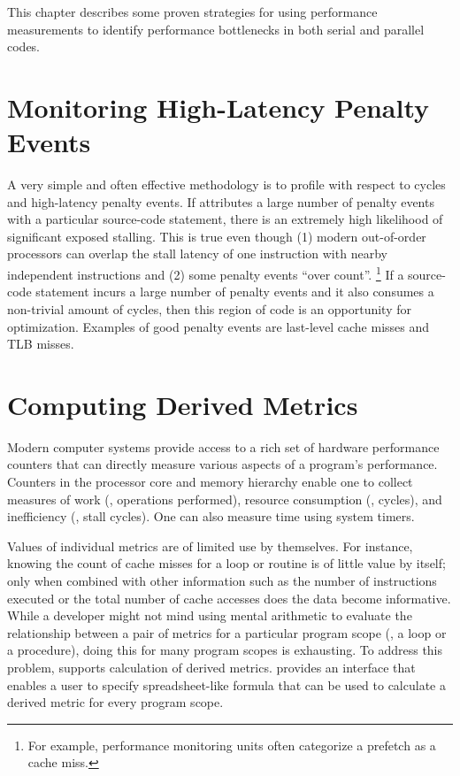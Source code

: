 \documentclass[11pt,letterpaper]{report}
\begin{document}
This chapter describes some proven strategies for using performance measurements to identify performance bottlenecks in both serial and parallel codes.



\section{Monitoring High-Latency Penalty Events}
\label{sec:effective-performance-analysis:penalty-events}

A very simple and often effective methodology is to profile with respect to cycles and high-latency penalty events.
If \HPCToolkit{} attributes a large number of penalty events with a particular source-code statement, there is an extremely high likelihood of significant exposed stalling.
This is true even though (1) modern out-of-order processors can overlap the stall latency of one instruction with nearby independent instructions and (2) some penalty events ``over count''.%
\footnote{For example, performance monitoring units often categorize a prefetch as a cache miss.}
If a source-code statement incurs a large number of penalty events and it also consumes a non-trivial amount of cycles, then this region of code is an opportunity for optimization.
Examples of good penalty events are last-level cache misses and TLB misses.



\section{Computing Derived Metrics}
\label{sec:effective-performance-analysis:derived-metrics}

Modern computer systems provide access to a rich set of hardware performance counters that can directly measure various aspects of a program's performance.
Counters in the processor core and memory hierarchy enable one to collect measures of work (\eg, operations performed), resource consumption (\eg, cycles), and inefficiency (\eg, stall cycles).
One can also measure time using system timers.

Values of individual metrics are of limited use by themselves.
For instance, knowing the count of cache misses for a loop or routine is of little value by itself; only when combined with other information such as the number of instructions executed or the total number of cache accesses does the data become informative.
While a developer might not mind using mental arithmetic to evaluate the relationship between a pair of metrics for a particular program scope (\eg, a loop or a procedure), doing this for many program scopes is exhausting.
To address this problem, \hpcviewer{} supports calculation of derived metrics.
\hpcviewer{} provides an interface that enables a user to specify spreadsheet-like formula that can be used to calculate a derived metric for every program scope. 
\end{document}
